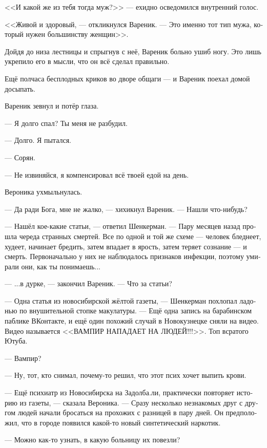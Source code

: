 \documentclass[a5paper,12pt,fleqn]{extbook}\usepackage{cooltooltips}\usepackage{polyglossia}\setdefaultlanguage[babelshorthands=true]{russian}\setotherlanguage{english}\defaultfontfeatures{Ligatures=TeX,Mapping=tex-text} \usepackage{xcolor}\definecolor{lightgray}{HTML}{bbbbbb}\color{lightgray}\newcommand{\ml}[3]{\textenglish{\textcolor{black}{#3}}}
\newcommand{\asterism}{\vspace{1em}{\centering\Large\bfseries$\ast~\ast~\ast$\par}\vspace{1em}}
\newcommand{\textspace}{\vspace{1em}{\centering\Large\bfseries<...>\par}\vspace{1em}}
\begin{document}
<<И какой же из тебя тогда муж?>> --- ехидно осведомился внутренний голос.

<<Живой и здоровый, --- откликнулся Вареник.
--- Это именно тот тип мужа, который нужен большинству женщин>>.

Дойдя до низа лестницы и спрыгнув с неё, Вареник больно ушиб ногу.
Это лишь укрепило его в мысли, что он всё сделал правильно.

Ещё полчаса бесплодных криков во дворе общаги --- и Вареник поехал домой досыпать.

\asterism

\textspace

Вареник зевнул и потёр глаза.

--- Я долго спал?
Ты меня не разбудил.

--- Долго.
Я пытался.

--- Сорян.

--- Не извиняйся, я компенсировал всё твоей едой на день.

Вероника ухмыльнулась.

--- Да ради Бога, мне не жалко, --- хихикнул Вареник.
--- Нашли что-нибудь?

--- Нашёл кое-какие статьи, --- ответил Шенкерман.
--- Пару месяцев назад прошла череда странных смертей.
Все по одной и той же схеме --- человек бледнеет, худеет, начинает бредить, затем впадает в ярость, затем теряет сознание --- и смерть.
Первоначально у них не наблюдалось признаков инфекции, поэтому умирали они, как ты понимаешь...

--- ...в дурке, --- закончил Вареник.
--- Что за статьи?

--- Одна статья из новосибирской жёлтой газеты, --- Шенкерман похлопал ладонью по внушительной стопке макулатуры.
--- Ещё одна запись на барабинском паблике ВКонтакте, и ещё один похожий случай в Новокузнецке сняли на видео.
Видео называется <<ВАМПИР НАПАДАЕТ НА ЛЮДЕЙ!!!>>.
Топ всратого Ютуба.

--- Вампир?

--- Ну, тот, кто снимал, почему-то решил, что этот псих хочет выпить крови.

--- Ещё психиатр из Новосибирска на Задолба.ли, практически повторяет историю из газеты, --- сказала Вероника.
--- Сразу несколько незнакомых друг с другом людей начали бросаться на прохожих с разницей в пару дней.
Он предположил, что в городе появился какой-то новый синтетический наркотик.

--- Можно как-то узнать, в какую больницу их повезли?
\end{document}

